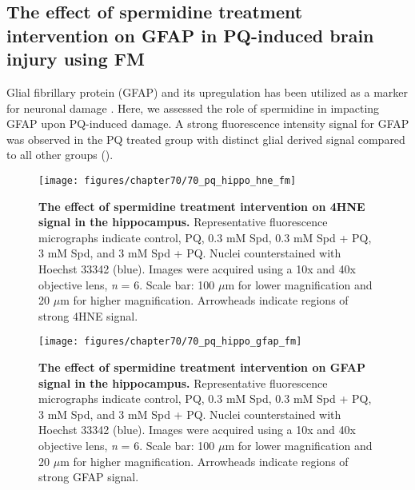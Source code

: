 \subsection{The effect of spermidine treatment intervention on GFAP in PQ-induced brain injury using FM} 
Glial fibrillary protein (GFAP) and its upregulation has been utilized as a marker for neuronal damage \citep{Wu2015}. Here, we assessed the role of spermidine in impacting GFAP upon PQ-induced damage. A strong fluorescence intensity signal for GFAP was observed in the PQ treated group with distinct glial derived signal compared to all other groups ().

\begin{landscape}
\begin{figure}[!htbp]
\center
  \texttt{[image: figures/chapter70/70\_pq\_hippo\_hne\_fm]}
  \caption[The effect of spermidine treatment intervention on 4HNE signal in the hippocampus]{\textbf{The effect of spermidine treatment  intervention on 4HNE signal in the hippocampus.} Representative fluorescence micrographs indicate control, PQ, 0.3 mM Spd, 0.3 mM Spd + PQ, 3 mM Spd, and 3 mM Spd + PQ. Nuclei counterstained with Hoechst 33342 (blue). Images were acquired using a 10x and 40x objective lens, \textit{n} = 6. Scale bar: 100 $\mu$m for lower magnification and 20 $\mu$m for higher magnification. Arrowheads indicate regions of strong 4HNE signal.}
  \label{fig:70_pq_hippo_hne_fm}
\end{figure} 
\end{landscape}

\begin{landscape}
\begin{figure}[!htbp]
\center
  \texttt{[image: figures/chapter70/70\_pq\_hippo\_gfap\_fm]}
  \caption[The effect of spermidine treatment intervention on GFAP signal in the hippocampus]{\textbf{The effect of spermidine treatment intervention on GFAP signal in the hippocampus.} Representative fluorescence micrographs indicate control, PQ, 0.3 mM Spd, 0.3 mM Spd + PQ, 3 mM Spd, and 3 mM Spd + PQ. Nuclei counterstained with Hoechst 33342 (blue). Images were acquired using a 10x and 40x objective lens, \textit{n} = 6. Scale bar: 100 $\mu$m for lower magnification and 20 $\mu$m for higher magnification. Arrowheads indicate regions of strong GFAP signal.}
  \label{fig:70_pq_hippo_gfap_fm}
\end{figure} 
\end{landscape}

